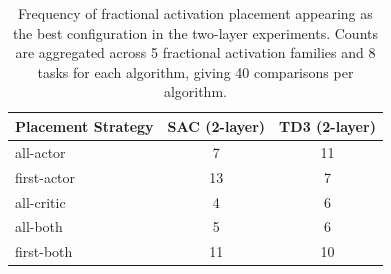 \begin{table}[!htbp]
\centering
\caption{Frequency of fractional activation placement appearing as the best configuration in the two-layer experiments. Counts are aggregated across 5 fractional activation families and 8 tasks for each algorithm, giving 40 comparisons per algorithm.}
\label{tab:fractional-placement-frequency}
\small
\setlength{\tabcolsep}{6pt}
\renewcommand{\arraystretch}{1.1}
\begin{tabular}{lcc}
\toprule
Placement Strategy & SAC (2-layer) & TD3 (2-layer) \\
\midrule
all-actor & 7 & 11 \\
first-actor & 13 & 7 \\
all-critic & 4 & 6 \\
all-both & 5 & 6 \\
first-both & 11 & 10 \\
\bottomrule
\end{tabular}
\end{table}
